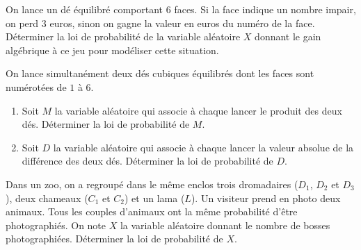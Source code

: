 \documentclass[11pt]{article}
\begin{document}

\begin{exo}
On lance un dé équilibré comportant $6$ faces. Si la
face indique un nombre impair, on perd $3$ euros, sinon on gagne la valeur en
euros du numéro de la face.\\
Déterminer la loi de probabilité de la variable aléatoire $X$ donnant le gain
algébrique à ce jeu pour modéliser cette situation.
\end{exo}

\begin{exo}
  On lance simultanément deux dés cubiques équilibrés dont les faces sont
  numérotées de $1$ à $6$.
  \begin{enumerate}
    \item Soit $M$ la variable aléatoire qui associe à chaque lancer le produit
      des deux dés. Déterminer la loi de probabilité de $M$.
    \item Soit $D$ la variable aléatoire qui associe à chaque lancer la valeur
      absolue de la différence des deux dés. Déterminer la loi de probabilité de
      $D$.
  \end{enumerate}
\end{exo}

\begin{exo}
  Dans un zoo, on a regroupé dans le même enclos trois dromadaires ($D_1$, $D_2$
  et $D_3$), deux chameaux ($C_1$ et $C_2$) et un lama ($L$). Un visiteur prend
  en photo deux animaux. Tous les couples d'animaux ont la même probabilité
  d'être photographiés. On note $X$ la variable aléatoire donnant le nombre de
  bosses photographiées. Déterminer la loi de probabilité de $X$.
\end{exo}
\end{document}
